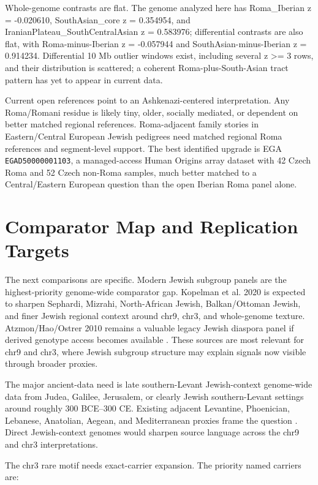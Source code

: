 \documentclass[11pt]{article}
\begin{document}
Whole-genome contrasts are flat. The genome analyzed here has Roma\_Iberian z = -0.020610, SouthAsian\_core z = 0.354954, and IranianPlateau\_SouthCentralAsian z = 0.583976; differential contrasts are also flat, with Roma-minus-Iberian z = -0.057944 and SouthAsian-minus-Iberian z = 0.914234. Differential 10 Mb outlier windows exist, including several z >= 3 rows, and their distribution is scattered; a coherent Roma-plus-South-Asian tract pattern has yet to appear in current data.

Current open references point to an Ashkenazi-centered interpretation. Any Roma/Romani residue is likely tiny, older, socially mediated, or dependent on better matched regional references. Roma-adjacent family stories in Eastern/Central European Jewish pedigrees need matched regional Roma references and segment-level support. The best identified upgrade is EGA \texttt{EGAD50000001103}, a managed-access Human Origins array dataset with 42 Czech Roma and 52 Czech non-Roma samples, much better matched to a Central/Eastern European question than the open Iberian Roma panel alone.

\section{Comparator Map and Replication Targets}

The next comparisons are specific. Modern Jewish subgroup panels are the highest-priority genome-wide comparator gap. Kopelman et al. 2020 is expected to sharpen Sephardi, Mizrahi, North-African Jewish, Balkan/Ottoman Jewish, and finer Jewish regional context around chr9, chr3, and whole-genome texture. Atzmon/Hao/Ostrer 2010 remains a valuable legacy Jewish diaspora panel if derived genotype access becomes available \citep{atzmon2010}. These sources are most relevant for chr9 and chr3, where Jewish subgroup structure may explain signals now visible through broader proxies.

The major ancient-data need is late southern-Levant Jewish-context genome-wide data from Judea, Galilee, Jerusalem, or clearly Jewish southern-Levant settings around roughly 300 BCE--300 CE. Existing adjacent Levantine, Phoenician, Lebanese, Anatolian, Aegean, and Mediterranean proxies frame the question \citep{haber2013}. Direct Jewish-context genomes would sharpen source language across the chr9 and chr3 interpretations.

The chr3 rare motif needs exact-carrier expansion. The priority named carriers are:
\end{document}
